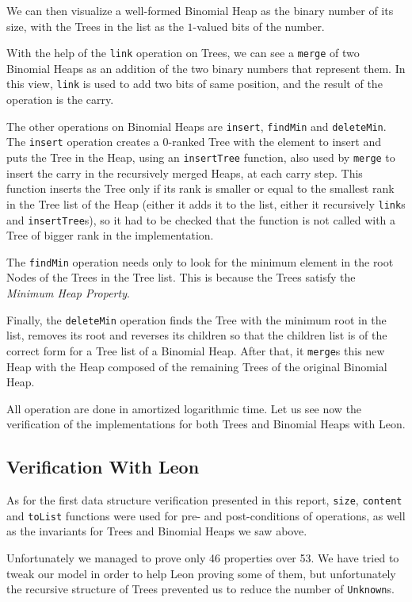 We can then visualize a well-formed Binomial Heap as the binary number of its size, 
with the Trees in the list as the $1$-valued bits of the number.

With the help of the \verb|link| operation on Trees, 
we can see a \verb|merge| of two Binomial Heaps 
as an addition of the two binary numbers that represent them.
In this view, \verb|link| is used to add two bits of same position,
and the result of the operation is the carry.

The other operations on Binomial Heaps are \verb|insert|, \verb|findMin| and \verb|deleteMin|. 
The \verb|insert| operation creates a $0$-ranked Tree with the element to insert 
and puts the Tree in the Heap, using an \verb|insertTree| function, 
also used by \verb|merge| to insert the carry in the recursively merged Heaps,
at each carry step.
This function inserts the Tree only if its rank is smaller or equal to the smallest rank in the Tree list of the Heap 
(either it adds it to the list, either it recursively \verb|link|s and \verb|insertTree|s),
so it had to be checked that the function is not called with a Tree of bigger rank in the implementation.

The \verb|findMin| operation needs only to look for the minimum element 
in the root Nodes of the Trees in the Tree list.
This is because the Trees satisfy the \emph{Minimum Heap Property}.

Finally, the \verb|deleteMin| operation finds the Tree with the minimum root in the list,
removes its root 
and reverses its children so that the children list is of the correct form for a Tree list of a Binomial Heap.
After that, it \verb|merge|s this new Heap with the Heap composed of 
the remaining Trees of the original Binomial Heap.

All operation are done in amortized logarithmic time.
Let us see now the verification of the implementations 
for both Trees and Binomial Heaps with Leon.

\subsection{Verification With Leon}
As for the first data structure verification presented in this report,
 \verb|size|, \verb|content| and \verb|toList| functions were used
 for pre- and post-conditions of operations,
as well as the invariants for Trees and Binomial Heaps we saw above.

Unfortunately we managed to prove only 46 properties over 53. 
We have tried to tweak our model in order to help Leon proving some of them,
but unfortunately the recursive structure of Trees prevented us to reduce the number of \verb|Unknown|s.

